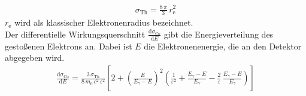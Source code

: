 \begin{align}
	\sigma_\text{Th} = \frac{8\,\pi}{3}\,r_\text{e}^2
\end{align}
$r_\text{e}$ wird als klassischer Elektronenradius bezeichnet. \\
Der differentielle Wirkungsquerschnitt $\frac{\text{d}\sigma_\text{Co}}{\text{d}E}$ gibt die Energieverteilung des gestoßenen Elektrons an. Dabei ist $E$ die Elektronenenergie, die an den Detektor abgegeben wird.
\begin{align}
	\frac{\text{d}\sigma_\text{Co}}{\text{d}E} = \frac{3\,\sigma_\text{Th}}{8\,m_0\,c^2\,\varepsilon^2} \left[2 + \left(\frac{E}{E_\gamma - E} \right)^2 \left(\frac{1}{\varepsilon^2} + \frac{E_\gamma - E}{E_\gamma} - \frac{2}{\varepsilon} \, \frac{E_\gamma - E}{E_\gamma} \right) \right]
\end{align}


